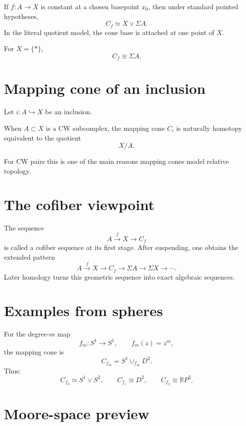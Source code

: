 \begin{proposition}
\label{prop:viii07-constant}
If \(f:A\to X\) is constant at a chosen basepoint \(x_0\), then under standard
pointed hypotheses,
\[
C_f\simeq X\vee\Sigma A.
\]
In the literal quotient model, the cone base is attached at one point of \(X\).
\end{proposition}

For \(X=\{*\}\),
\[
C_f\cong \Sigma A.
\]

\section{Mapping cone of an inclusion}

Let \(i:A\hookrightarrow X\) be an inclusion.

\begin{proposition}
\label{prop:viii07-inclusion}
When \(A\subset X\) is a CW subcomplex, the mapping cone \(C_i\) is naturally
homotopy equivalent to the quotient
\[
X/A.
\]
\end{proposition}

For CW pairs this is one of the main reasons mapping cones model relative
topology.

\section{The cofiber viewpoint}

The sequence
\[
A\xrightarrow{f}X\longrightarrow C_f
\]
is called a cofiber sequence at its first stage.  After suspending, one obtains
the extended pattern
\[
A\xrightarrow{f}X\longrightarrow C_f\longrightarrow\Sigma A
\longrightarrow\Sigma X\longrightarrow\cdots.
\]
Later homology turns this geometric sequence into exact algebraic sequences.

\section{Examples from spheres}

For the degree-\(m\) map
\[
f_m:S^1\to S^1,\qquad f_m(z)=z^m,
\]
the mapping cone is
\[
C_{f_m}=S^1\cup_{f_m}D^2.
\]
Thus:
\[
C_{f_0}\simeq S^1\vee S^2,\qquad
C_{f_1}\cong D^2,\qquad
C_{f_2}\cong\mathbb RP^2.
\]

\section{Moore-space preview}

